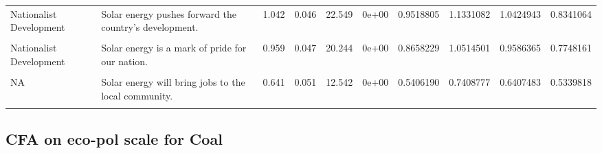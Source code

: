 \documentclass[
]{article}
\begin{document}
\begin{landscape}
\begin{table}[!h]
{\begin{tabular}[t]{l>{\raggedright\arraybackslash}p{4cm}rrrrrrrr}
Nationalist Development & Solar energy pushes forward the country's development. & 1.042 & 0.046 & 22.549 & 0e+00 & 0.9518805 & 1.1331082 & 1.0424943 & 0.8341064\\
\cellcolor{gray!6}{Nationalist Development} & \cellcolor{gray!6}{I would be proud if my community used solar energy} & \cellcolor{gray!6}{1.042} & \cellcolor{gray!6}{0.047} & \cellcolor{gray!6}{21.934} & \cellcolor{gray!6}{0e+00} & \cellcolor{gray!6}{0.9485906} & \cellcolor{gray!6}{1.1347564} & \cellcolor{gray!6}{1.0416735} & \cellcolor{gray!6}{0.8187225}\\
Nationalist Development & Solar energy is a mark of pride for our nation. & 0.959 & 0.047 & 20.244 & 0e+00 & 0.8658229 & 1.0514501 & 0.9586365 & 0.7748161\\
\addlinespace
\cellcolor{gray!6}{Nationalist Development} & \cellcolor{gray!6}{Solar energy brings economic prosperity to the surrounding regions.} & \cellcolor{gray!6}{0.980} & \cellcolor{gray!6}{0.047} & \cellcolor{gray!6}{20.803} & \cellcolor{gray!6}{0e+00} & \cellcolor{gray!6}{0.8876975} & \cellcolor{gray!6}{1.0723692} & \cellcolor{gray!6}{0.9800333} & \cellcolor{gray!6}{0.7896156}\\
NA & Solar energy will bring jobs to the local community. & 0.641 & 0.051 & 12.542 & 0e+00 & 0.5406190 & 0.7408777 & 0.6407483 & 0.5339818\\
\cellcolor{gray!6}{NA} & \cellcolor{gray!6}{Solar energy poses a great risk to the health of people living around it.} & \cellcolor{gray!6}{0.620} & \cellcolor{gray!6}{0.054} & \cellcolor{gray!6}{11.424} & \cellcolor{gray!6}{0e+00} & \cellcolor{gray!6}{0.5139817} & \cellcolor{gray!6}{0.7268665} & \cellcolor{gray!6}{0.6204241} & \cellcolor{gray!6}{0.3998333}\\
\bottomrule
\end{tabular}}
\end{table}
\end{landscape}

\newpage

\hypertarget{cfa-on-eco-pol-scale-for-coal}{%
\subsection{CFA on eco-pol scale for
Coal}\label{cfa-on-eco-pol-scale-for-coal}}
\end{document}
